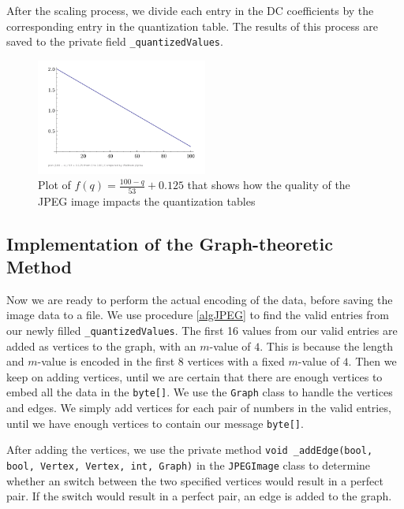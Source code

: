 After the scaling process, we divide each entry in the DC coefficients by the corresponding entry in the quantization table.
The results of this process are saved to the private field \lstinline|_quantizedValues|.

\begin{figure}
    \centering
    \includegraphics[width=0.5\textwidth]{figures/plotQuality.png}
    \caption{Plot of $f(q) = \frac{100-q}{53}+0.125$ that shows how the quality of the JPEG image impacts the quantization tables}
    \label{fig:plotQuality}
\end{figure}

\subsection{Implementation of the Graph-theoretic Method}

Now we are ready to perform the actual encoding of the data, before saving the image data to a file.
We use procedure \ref{algJPEG} to find the valid entries from our newly filled \lstinline|_quantizedValues|.
The first 16 values from our valid entries are added as vertices to the graph, with an $m$-value of $4$. This is because the length and $m$-value is encoded in the first 8 vertices with a fixed $m$-value of $4$.
Then we keep on adding vertices, until we are certain that there are enough vertices to embed all the data in the \lstinline|byte[]|.
We use the \lstinline|Graph| class to handle the vertices and edges.
We simply add vertices for each pair of numbers in the valid entries, until we have enough vertices to contain our message \lstinline|byte[]|.

After adding the vertices, we use the private method \lstinline|void _addEdge(bool, bool, Vertex, Vertex, int, Graph)| in the \lstinline|JPEGImage| class to determine whether an switch between the two specified vertices would result in a perfect pair.
If the switch would result in a perfect pair, an edge is added to the graph.

